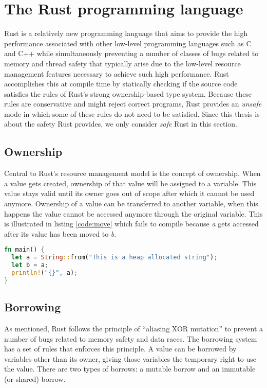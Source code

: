 \section{The Rust programming language}
\label{sec:rustbackground}
Rust is a relatively new programming language that aims to provide the high performance associated with other low-level programming languages such as C and C++ while simultaneously preventing a number of classes of bugs related to memory and thread safety that typically arise due to the low-level resource management features necessary to achieve such high performance.
Rust accomplishes this at compile time by statically checking if the source code satisfies the rules of Rust's strong ownership-based type system.
Because these rules are conservative and might reject correct programs, Rust provides an \textit{unsafe} mode in which some of these rules do not need to be satisfied.
Since this thesis is about the safety Rust provides, we only consider \textit{safe} Rust in this section.

\subsection{Ownership}
Central to Rust's resource management model is the concept of ownership.
When a value gets created, ownership of that value will be assigned to a variable.
This value stays valid until its owner goes out of scope after which it cannot be used anymore.
Ownership of a value can be transferred to another variable, when this happens the value cannot be accessed anymore through the original variable.
This is illustrated in listing \ref{code:move} which fails to compile because \textit{a} gets accessed after its value has been moved to \textit{b}.
\begin{lstlisting}[language=Rust,frame=single,caption=Moving a variable,label=code:move]
fn main() {
  let a = String::from("This is a heap allocated string");
  let b = a;
  println!("{}", a);
}
\end{lstlisting}

\subsection{Borrowing}
\label{subsec:borrowing}
As mentioned, Rust follows the principle of ``aliasing XOR mutation'' to prevent a number of bugs related to memory safety and data races.
The borrowing system has a set of rules that enforces this principle.
A value can be borrowed by variables other than its owner, giving those variables the temporary right to use the value.
There are two types of borrows: a mutable borrow and an immutable (or shared) borrow. 

